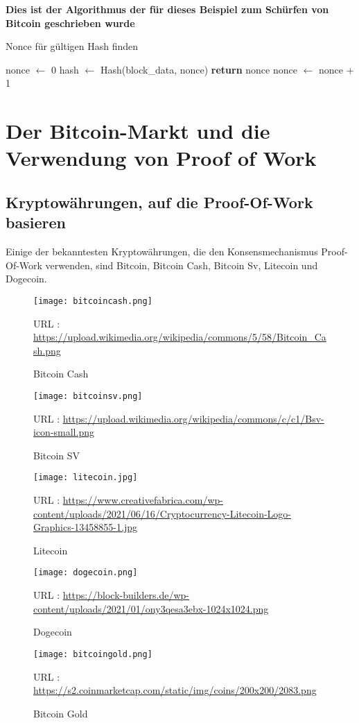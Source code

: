 \documentclass[ngerman]{scrreprt}
\begin{document}
\textbf{Dies ist der Algorithmus \textcommabelow der für dieses Beispiel zum Schürfen von Bitcoin geschrieben wurde} \\
\begin{algorithm}
	\caption{Nonce für gültigen Hash finden}
	\label{alg:nonce_find}
	
	\begin{algorithmic}[1]
		\State nonce $\gets$ 0
		\Repeat
		\State hash $\gets$ Hash(block\_data, nonce)
		\State \textbf{return} nonce
		\EndIf
		\State nonce $\gets$ nonce + 1
	\end{algorithmic}
\end{algorithm}

\chapter{Der Bitcoin-Markt und die Verwendung von Proof of Work}
\section{Kryptowährungen, auf die Proof-Of-Work basieren}

	Einige der bekanntesten Kryptowährungen, die den Konsensmechanismus Proof-Of-Work verwenden, sind Bitcoin, Bitcoin Cash, Bitcoin Sv, Litecoin und Dogecoin. \\
		
	\begin{figure}[H]
		\centering
		\texttt{[image: bitcoincash.png]}
		\caption{Bitcoin Cash}
		\small URL : \url{https://upload.wikimedia.org/wikipedia/commons/5/58/Bitcoin_Cash.png}
	\end{figure} 
	\begin{figure}[H]
		\centering
		\texttt{[image: bitcoinsv.png]}
		\caption{Bitcoin SV}
		\small URL : \url{https://upload.wikimedia.org/wikipedia/commons/c/c1/Bsv-icon-small.png}
	\end{figure}
	\begin{figure}[H]
		\centering
		\texttt{[image: litecoin.jpg]}
		\caption{Litecoin}
		\small URL : \url{https://www.creativefabrica.com/wp-content/uploads/2021/06/16/Cryptocurrency-Litecoin-Logo-Graphics-13458855-1.jpg}
	\end{figure} 
	\begin{figure}[H]
		\centering
		\texttt{[image: dogecoin.png]}
		\caption{Dogecoin}
		\small URL : \url{https://block-builders.de/wp-content/uploads/2021/01/ony3qesa3ebx-1024x1024.png}
	\end{figure} 
	\begin{figure}[H]
		\centering
		\texttt{[image: bitcoingold.png]}
		\caption{Bitcoin Gold}
		\small URL : \url{https://s2.coinmarketcap.com/static/img/coins/200x200/2083.png}
	\end{figure} 
\end{document}
